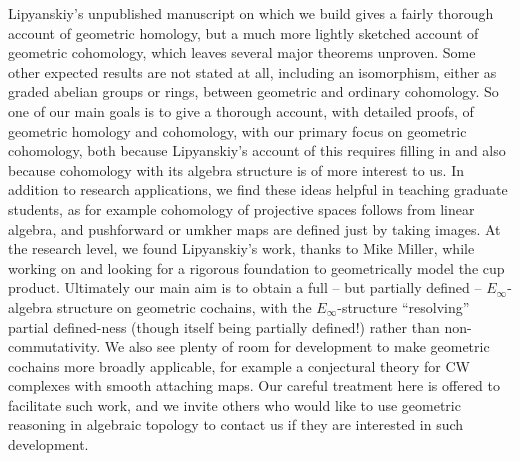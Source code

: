 Lipyanskiy's unpublished manuscript \cite{Lipy14} on which we build gives a fairly thorough account of geometric homology, but a much more lightly sketched account of geometric cohomology, which leaves several major theorems  unproven.
Some other expected results are not stated at all, including an isomorphism, either as graded abelian groups or rings, between geometric and ordinary cohomology.
So one of our main goals is to give a thorough account, with detailed proofs, of geometric homology and cohomology, with our primary focus on geometric cohomology, both because Lipyanskiy's account of this requires filling in and also because cohomology with its algebra structure is of more interest to us.
In addition to research applications, we find these ideas helpful in teaching graduate students, as for example cohomology of projective spaces follows from linear algebra, and pushforward or umkher maps are defined just by taking images.
At the research level, we found Lipyanskiy's work, thanks to Mike Miller, while working on \cite{FMS-flows} and looking for a rigorous foundation to geometrically model the cup product.
Ultimately our main aim is to obtain a full -- but partially defined -- $E_\infty$-algebra structure on geometric cochains, with the $E_\infty$-structure ``resolving'' partial defined-ness (though itself being partially defined!) rather than non-commutativity.
We also see plenty of room for development to make geometric cochains more broadly applicable, for example a conjectural theory for CW complexes with smooth attaching maps.
Our careful treatment here is offered to facilitate such work, and we invite others who would like to use geometric reasoning in algebraic topology to contact us if they are interested in such development.


